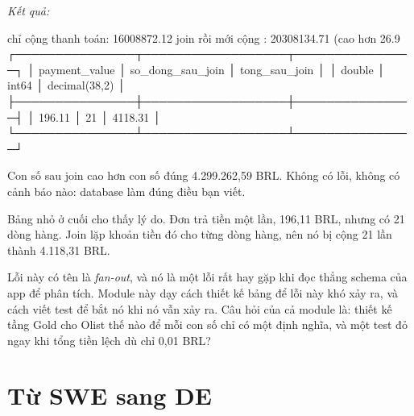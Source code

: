 \textit{Kết quả:}
\begin{codeblock}
chỉ cộng thanh toán: 16008872.12
join rồi mới cộng  : 20308134.71 (cao hơn 26.9%
┌───────────────┬──────────────────┬───────────────┐
│ payment_value │ so_dong_sau_join │ tong_sau_join │
│    double     │      int64       │ decimal(38,2) │
├───────────────┼──────────────────┼───────────────┤
│        196.11 │               21 │       4118.31 │
└───────────────┴──────────────────┴───────────────┘
\end{codeblock}

Con số sau join cao hơn con số đúng 4.299.262,59 BRL. Không có lỗi, không có cảnh báo nào: database làm đúng điều bạn viết.

Bảng nhỏ ở cuối cho thấy lý do. Đơn  trả tiền một lần, 196,11 BRL, nhưng có 21 dòng hàng. Join lặp khoản tiền đó cho từng dòng hàng, nên nó bị cộng 21 lần thành 4.118,31 BRL.

Lỗi này có tên là \textit{fan-out}, và nó là một lỗi rất hay gặp khi đọc thẳng schema của app để phân tích. Module này dạy cách thiết kế bảng để lỗi này khó xảy ra, và cách viết test để bắt nó khi nó vẫn xảy ra. Câu hỏi của cả module là: thiết kế tầng Gold cho Olist thế nào để mỗi con số chỉ có một định nghĩa, và một test đỏ ngay khi tổng tiền lệch dù chỉ 0,01 BRL?

\section{Từ SWE sang DE}

